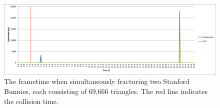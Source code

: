 \FloatBarrier

\FloatBarrier

\begin{figure}
\centerline{\includegraphics[scale=0.7]{../Logs/double_bunny_frametime.png}}
\caption{The frametime when simultaneously fracturing two Stanford Bunnies, each consisting of 69,666 triangles. The red line indicates the collision time.}
\label{fig:4.31.1}
\end{figure}

